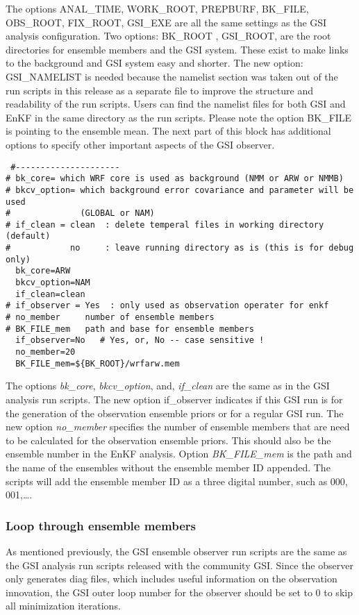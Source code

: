 The options ANAL\_TIME, WORK\_ROOT, PREPBURF, BK\_FILE, OBS\_ROOT, FIX\_ROOT, GSI\_EXE are all the same settings as the GSI analysis configuration. Two options: BK\_ROOT , GSI\_ROOT, are the root directories for ensemble members and the GSI system. These exist to make links to the background and GSI system easy and shorter. The new option: GSI\_NAMELIST is needed because the namelist section was taken out of the run scripts in this release as a separate file to improve the structure and readability of the run scripts. Users can find the namelist files for both GSI and EnKF in the same directory as the run scripts. Please note the option BK\_FILE is pointing to the ensemble mean.
The next part of this block has additional options to specify other important aspects of the GSI observer.
\begin{scriptsize}
 \begin{verbatim}
 #---------------------
# bk_core= which WRF core is used as background (NMM or ARW or NMMB)
# bkcv_option= which background error covariance and parameter will be used
#              (GLOBAL or NAM)
# if_clean = clean  : delete temperal files in working directory (default)
#            no     : leave running directory as is (this is for debug only)
  bk_core=ARW
  bkcv_option=NAM
  if_clean=clean
# if_observer = Yes  : only used as observation operater for enkf
# no_member     number of ensemble members
# BK_FILE_mem   path and base for ensemble members
  if_observer=No   # Yes, or, No -- case sensitive !
  no_member=20
  BK_FILE_mem=${BK_ROOT}/wrfarw.mem
\end{verbatim}
\end{scriptsize}
  
  The options \textit{bk\_core}, \textit{bkcv\_option}, and, \textit{if\_clean} are the same as in the GSI analysis run scripts. The new option if\_observer indicates if this GSI run is for the generation of the observation ensemble priors or for a regular GSI run. The new option \textit{no\_member} specifies the number of ensemble members that are need to be calculated for the observation ensemble priors. This should also be the ensemble number in the EnKF analysis. Option \textit{BK\_FILE\_mem} is the path and the name of the ensembles without the ensemble member ID appended. The scripts will add the ensemble member ID as a three digital number, such as 000, 001,\ldots .
      
\subsubsection{Loop through ensemble members}
 As mentioned previously, the GSI ensemble observer run scripts are the same as the GSI analysis run scripts released with the community GSI. Since the observer only generates diag files, which includes useful information on the observation innovation, the GSI outer loop number for the observer should be set to 0 to skip all minimization iterations.
 
